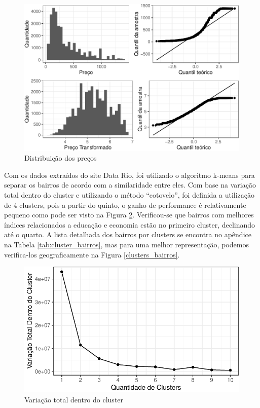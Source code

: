 \documentclass[
	12pt,				%
	a4paper,		%
	oneside,    %
	chapter=TITLE,		   %
	section=TITLE,		   %
	subsection=TITLE,	   %
	subsubsection=TITLE, %
	english,			%
	french,				%
	spanish,			%
	brazil,				%
]{abntex2}
\begin{document}
\begin{figure}
\centering
\includegraphics{00-TCC_files/figure-latex/dist_preco-1.pdf}
\caption{\label{dist_preco}Distribuição dos preços}
\end{figure}

Com os dados extraídos do site Data Rio, foi utilizado o algoritmo
k-means para separar os bairros de acordo com a similaridade entre eles.
Com base na variação total dentro do cluster e utilizando o método
``cotovelo'', foi definida a utilização de 4 clusters, pois a partir do
quinto, o ganho de performance é relativamente pequeno como pode ser
visto na Figura \ref{wss}. Verificou-se que bairros com melhores índices
relacionados a educação e economia estão no primeiro cluster, declinando
até o quarto. A lista detalhada dos bairros por clusters se encontra no
apêndice na Tabela \ref{tab:cluster_bairros}, mas para uma melhor
representação, podemos verifica-los geograficamente na Figura
\ref{clusters_bairros}.

\begin{figure}
\centering
\includegraphics{00-TCC_files/figure-latex/wss-1.pdf}
\caption{\label{wss}Variação total dentro do cluster}
\end{figure}
\end{document}
